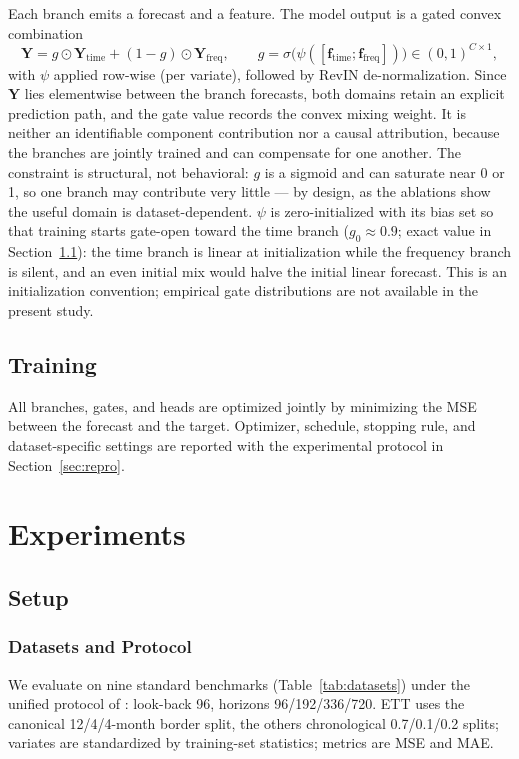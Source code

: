 \documentclass[review,12pt]{elsarticle}
\begin{document}
Each branch emits a forecast and a feature. The model output is a gated
convex combination
\begin{equation}
\mathbf{Y} = g \odot \mathbf{Y}_{\mathrm{time}} + (1 - g) \odot
\mathbf{Y}_{\mathrm{freq}}, \qquad
g = \sigma\!\big(\psi([\mathbf{f}_{\mathrm{time}};
\mathbf{f}_{\mathrm{freq}}])\big) \in (0,1)^{C\times 1},
\label{eq:fusion}
\end{equation}
with $\psi$ applied row-wise (per variate), followed by RevIN
de-normalization. Since $\mathbf{Y}$ lies elementwise between the branch
forecasts, both domains retain an explicit prediction path, and the gate
value records the convex mixing weight. It is neither an identifiable
component contribution nor a causal attribution, because the branches are
jointly trained and can compensate for one another. The constraint is
structural, not behavioral: $g$ is a sigmoid and can saturate near 0 or 1,
so one branch may contribute very little --- by design, as the ablations
show the useful domain is dataset-dependent. $\psi$ is zero-initialized
with its bias set so that training starts gate-open toward the time branch
($g_0 \approx 0.9$; exact value in Section~\ref{sec:setup}): the time branch
is linear at initialization while the frequency branch is silent, and an
even initial mix would halve the initial linear forecast. This is an
initialization convention; empirical gate distributions are not available in
the present study.

\subsection{Training}
All branches, gates, and heads are optimized jointly by minimizing the MSE
between the forecast and the target. Optimizer, schedule, stopping rule, and
dataset-specific settings are reported with the experimental protocol in
Section~\ref{sec:repro}.

\section{Experiments}
\label{sec:experiments}

\subsection{Setup}
\label{sec:setup}

\subsubsection{Datasets and Protocol}
We evaluate on nine standard benchmarks
(Table~\ref{tab:datasets}) under the unified protocol of
\cite{itransformer,smamba}: look-back 96, horizons 96/192/336/720. ETT
uses the canonical 12/4/4-month border split, the others chronological
0.7/0.1/0.2 splits; variates are standardized by training-set statistics;
metrics are MSE and MAE.
\end{document}
